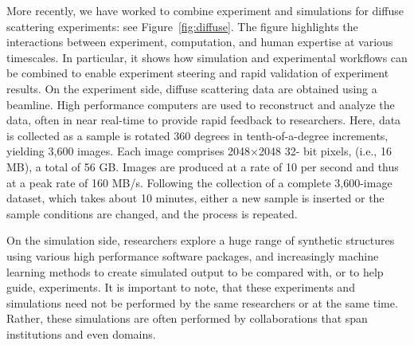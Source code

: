 \documentclass{aip-cp}
\begin{document}
More recently, we have worked to combine experiment and simulations
for diffuse scattering experiments: see Figure~\ref{fig:diffuse}. 
The figure highlights the interactions between experiment, computation, and human expertise
at various timescales. In particular, it shows how simulation and 
experimental workflows can be combined to enable experiment steering and 
rapid validation of experiment results.
On the experiment side, diffuse scattering data are obtained using a beamline.  
High performance computers are used to reconstruct and analyze the data, often in
near real-time to provide rapid feedback to researchers. Here, data is collected
as a sample is rotated 360 degrees in tenth-of-a-degree increments, yielding
3,600 images. Each image comprises 2048$\times$2048 32-
bit pixels, (i.e., 16 MB), a total of 56 GB. Images are
produced at a rate of 10 per second and thus at a peak rate of
160 MB/s. Following the collection of a complete 3,600-image
dataset, which takes about 10 minutes, either a new sample
is inserted or the sample conditions are changed,
and the process is repeated. 


On the simulation side, researchers explore a huge range of synthetic structures
using various high performance software packages, and increasingly machine learning
methods to create simulated output to be compared with, or to help guide, experiments. 
It is important to note, that these experiments and simulations need not be performed
by the same researchers or at the same time. Rather, these simulations are often performed by
collaborations that span institutions and even domains. 
\end{document}
